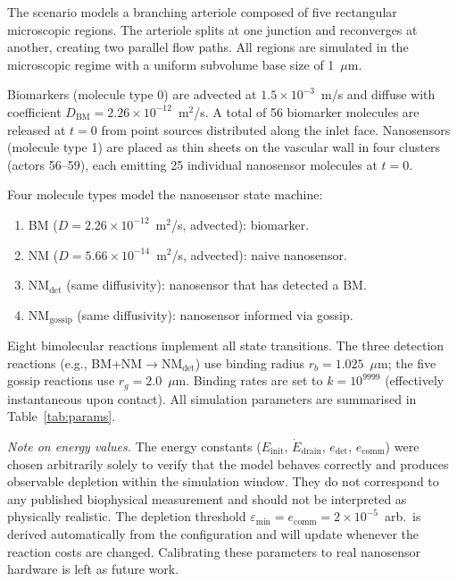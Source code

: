\documentclass[journal]{IEEEtran}
\begin{document}
The scenario models a branching arteriole composed of five rectangular
microscopic regions. The arteriole splits at one junction and reconverges
at another, creating two parallel flow paths. All regions are simulated in
the microscopic regime with a uniform subvolume base size of 1~$\mu$m.

Biomarkers (molecule type 0) are advected at $1.5 \times 10^{-3}$~m/s and
diffuse with coefficient $D_\mathrm{BM} = 2.26 \times 10^{-12}$~m$^2$/s.
A total of 56 biomarker molecules are released at $t=0$ from point sources
distributed along the inlet face. Nanosensors (molecule type 1) are placed
as thin sheets on the vascular wall in four clusters (actors 56--59), each
emitting 25 individual nanosensor molecules at $t=0$.

Four molecule types model the nanosensor state machine:
\begin{enumerate}
  \item BM ($D = 2.26\times10^{-12}$~m$^2$/s, advected): biomarker.
  \item NM ($D = 5.66\times10^{-14}$~m$^2$/s, advected): naive nanosensor.
  \item NM$_\mathrm{det}$ (same diffusivity): nanosensor that has detected a BM.
  \item NM$_\mathrm{gossip}$ (same diffusivity): nanosensor informed via gossip.
\end{enumerate}
Eight bimolecular reactions implement all state transitions. The three
detection reactions (e.g., BM+NM$\to$NM$_\mathrm{det}$) use binding radius
$r_b = 1.025$~$\mu$m; the five gossip reactions use $r_g = 2.0$~$\mu$m.
Binding rates are set to $k = 10^{9999}$ (effectively instantaneous upon
contact). All simulation parameters are summarised in Table~\ref{tab:params}.

\emph{Note on energy values.} The energy constants
($E_\mathrm{init}$, $\dot{E}_\mathrm{drain}$, $e_\mathrm{det}$,
$e_\mathrm{comm}$) were chosen arbitrarily solely to verify that the model
behaves correctly and produces observable depletion within the simulation
window. They do not correspond to any published biophysical measurement and
should not be interpreted as physically realistic. The depletion threshold
$\varepsilon_\mathrm{min} = e_\mathrm{comm} = 2\times10^{-5}$~arb.\ is derived
automatically from the configuration and will update whenever the reaction
costs are changed. Calibrating these parameters to real nanosensor hardware is
left as future work.

\end{document}
